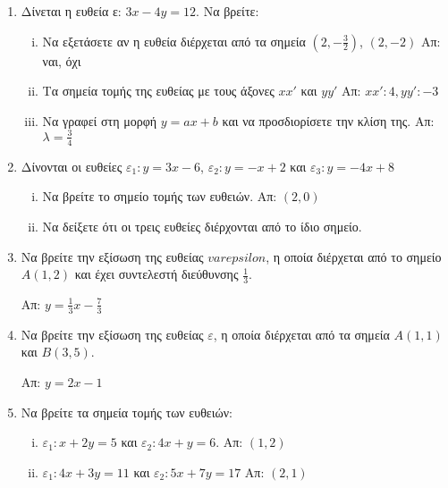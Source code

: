 


\everymath{\displaystyle}



 \begin{center}
 \end{center}

\vspace{\baselineskip}

\begin{enumerate}
	 \item  Δίνεται η ευθεία ε:  $ 3x - 4y = 12 $.  Να βρείτε:
		 \begin{enumerate}[i)]
			 \item Να εξετάσετε αν η ευθεία διέρχεται από τα σημεία $\left(2,- \frac{3}{2}
				 \right)$, $ (2,-2) $ \hfill Απ:  ναι, όχι 
			 \item  Τα σημεία τομής της ευθείας με τους άξονες  $ xx' $  και  $ yy' $ \hfill Απ:
				 $ xx': 4, yy':-3 $ 
			 \item Να γραφεί στη μορφή $ y=ax+b $ και να προσδιορίσετε την κλίση της. \hfill
				 Απ: $ \lambda = \frac{3}{4} $ 
		 \end{enumerate}

	 \item  Δίνονται οι ευθείες $ \varepsilon_1:   y = 3x-6 $, $ \varepsilon_2:   y = -x+2 $  και
		 $ \varepsilon_3:   y = -4x+8 $
		 \begin{enumerate}[i)]
			 \item  Να βρείτε το σημείο τομής των ευθειών.  \hfill Απ: $ (2,0) $
			 \item  Να δείξετε ότι οι τρεις ευθείες διέρχονται από το ίδιο σημείο.
		 \end{enumerate}

	 \item  Να βρείτε την εξίσωση της ευθείας  $ varepsilon $,  η οποία διέρχεται από το σημείο  $
		 A(1,2) $ και έχει συντελεστή διεύθυνσης  $ \frac{1}{3} $.

		 \hfill Απ: $ y = \frac{1}{3} x - \frac{7}{3} $ 

	 \item  Να βρείτε την εξίσωση της ευθείας  $\varepsilon$, η οποία διέρχεται από τα σημεία  $
		 A(1,1) $  και  $ B(3,5) $. 

		 \hfill Απ: $ y=2x-1 $ 

	 \item  Να βρείτε τα  σημεία τομής των ευθειών:
		 \begin{enumerate}[i)]
			 \item $ \varepsilon_{1}: x + 2y = 5 $   και  $\varepsilon_{2}: 4x + y = 6 $.
				 \hfill Απ: $ (1,2) $ 
			 \item $ \varepsilon_{1}: 4x+3y=11 $ και  $ \varepsilon_{2}: 5x+7y=17 $ \hfill Απ: $
				 (2,1) $ 
		 \end{enumerate}



\end{enumerate}
